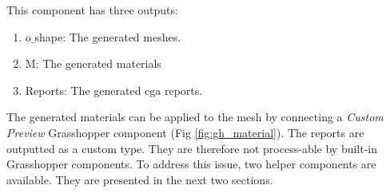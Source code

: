 This component has three outputs:
\begin{enumerate}
    \item o$\_$shape: The generated meshes.
    \item M: The generated materials
    \item Reports: The generated cga reports.
\end{enumerate}

The generated materials can be applied to the mesh by connecting a \textit{Custom Preview} Grasshopper component (Fig \ref{fig:gh_material}). The reports are outputted as a custom type. They are therefore not process-able by built-in Grasshopper components. To address this issue, two helper components are available. They are presented in the next two sections.

\begin{figure}[h]
    

\end{figure}
